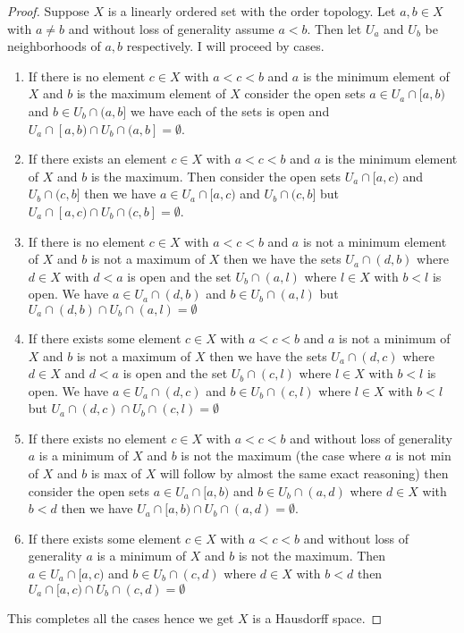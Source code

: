 \documentclass{amsart}
\theoremstyle{plain}
\theoremstyle{definition}
\theoremstyle{remark}
\begin{document}
\begin{proof}
    Suppose $X$ is a linearly ordered set with the order topology. Let $a,b\in X$ with $a\not = b$ and without loss of generality assume $a<b$. Then let $U_a$ and $U_b$ be neighborhoods of $a,b$ respectively. I will proceed by cases. 
    \begin{enumerate}
        \item If there is no element $c\in X$ with $a<c<b$ and $a$ is the minimum element of $X$ and $b$ is the maximum element of $X$ consider the open sets $a\in U_a\cap [a,b)$ and $b\in U_b\cap (a,b]$ we have each of the sets is open and $U_a\cap [a,b)\cap U_b\cap (a,b]=\emptyset$. 
        \item If there exists an element $c\in X$ with $a<c<b$ and $a$ is the minimum element of $X$ and $b$ is the maximum. Then consider the open sets $U_a\cap [a,c)$ and $U_b\cap (c,b]$ then we have $a\in U_a\cap [a,c)$ and $U_b\cap (c,b]$ but $U_a \cap[a,c) \cap U_b\cap (c,b]=\emptyset$.
        \item If there is no element $c\in X$ with $a<c<b$ and $a$ is not a minimum element of $X$ and $b$ is not a maximum of $X$ then we have the sets $U_a\cap (d,b)$ where $d\in X$ with $d<a$ is open and the set $U_b\cap (a,l)$ where $l\in X$ with $b<l$ is open. We have $a\in U_a\cap (d,b)$ and $b\in U_b\cap (a,l)$ but $U_a\cap (d,b)\cap  U_b\cap (a,l)=\emptyset $
        \item If there exists some element $c\in X$ with $a<c<b$ and $a$ is not a minimum of $X$ and $b$ is not a maximum of $X$ then we have the sets $U_a\cap (d,c)$ where $d\in X$ and $d<a$ is open and the set $U_b\cap (c,l)$ where $l\in X$ with $b<l$ is open. We have $a\in U_a\cap (d,c)$ and $b\in U_b\cap (c,l)$ where $l\in X$ with $b<l$ but $U_a \cap (d,c)\cap U_b \cap (c,l)=\emptyset$
        \item If there exists no element $c\in X$ with $a<c<b$ and without loss of generality $a$ is a minimum of $X$ and $b$ is not the maximum (the case where $a$ is not min of $X$ and $b$ is max of $X$ will follow by almost the same exact reasoning) then consider the open sets $a\in U_a\cap [a,b)$ and $b\in U_b\cap (a,d)$ where $d\in X$ with $b<d$ then we have $U_a\cap [a,b) \cap U_b\cap (a,d)=\emptyset$.
        \item If there exists some element $c\in X$ with $a<c<b$ and without loss of generality $a$ is a minimum of $X$ and $b$ is not the maximum. Then $a\in U_a\cap [a,c)$ and $b\in U_b\cap (c,d)$ where $d\in X$ with $b<d$ then $U_a\cap [a,c) \cap U_b\cap (c,d)=\emptyset$ 
    \end{enumerate} 
    This completes all the cases hence we get $X$ is a Hausdorff space.
\end{proof}
\end{document}
